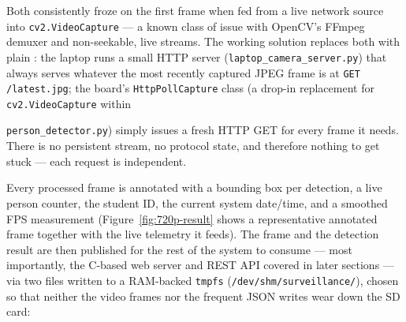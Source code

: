 Both consistently froze on the first frame when fed from a live network
source into \texttt{cv2.VideoCapture} — a known class of issue with
OpenCV's FFmpeg demuxer and non-seekable, live streams. The working
solution replaces both with plain : the laptop runs
a small HTTP server (\texttt{laptop\_camera\_server.py}) that always
serves whatever the most recently captured JPEG frame is at
\texttt{GET /latest.jpg}; the board's \texttt{HttpPollCapture} class
(a drop-in replacement for \texttt{cv2.VideoCapture} within

\texttt{person\_detector.py}) simply issues a fresh HTTP GET for every
frame it needs. There is no persistent stream, no protocol state, and
therefore nothing to get stuck — each request is independent.

\begin{table}[H]
\centering
\caption{The four-process capture pipeline, spanning both machines.}
\label{tab:capture-pipeline}
\end{table}


Every processed frame is annotated with a bounding box per detection, a
live person counter, the student ID, the current system date/time, and a
smoothed FPS measurement (Figure~\ref{fig:720p-result} shows a
representative annotated frame together with the live telemetry it feeds).
The frame and the detection result are then published for the rest of the
system to consume — most importantly, the C-based web server and REST API
covered in later sections — via two files written to a RAM-backed
\texttt{tmpfs} (\texttt{/dev/shm/surveillance/}), chosen so that neither
the video frames nor the frequent JSON writes wear down the SD card:

